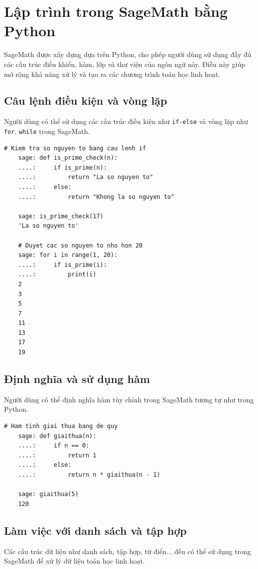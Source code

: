 \section{Lập trình trong SageMath bằng Python}
	
SageMath được xây dựng dựa trên Python, cho phép người dùng sử dụng đầy đủ các cấu trúc điều khiển, hàm, lớp và thư viện của ngôn ngữ này. Điều này giúp mở rộng khả năng xử lý và tạo ra các chương trình toán học linh hoạt.

\subsection{Câu lệnh điều kiện và vòng lặp}
Người dùng có thể sử dụng các cấu trúc điều kiện như \texttt{if-else} và vòng lặp như \texttt{for}, \texttt{while} trong SageMath.

\begin{lstlisting}[basicstyle=\ttfamily\small]
	# Kiem tra so nguyen to bang cau lenh if
	sage: def is_prime_check(n):
	....:     if is_prime(n):
	....:         return "La so nguyen to"
	....:     else:
	....:         return "Khong la so nguyen to"
	
	sage: is_prime_check(17)
	'La so nguyen to'
	
	# Duyet cac so nguyen to nho hon 20
	sage: for i in range(1, 20):
	....:     if is_prime(i):
	....:         print(i)
	2
	3
	5
	7
	11
	13
	17
	19
\end{lstlisting}

\subsection{Định nghĩa và sử dụng hàm}
Người dùng có thể định nghĩa hàm tùy chỉnh trong SageMath tương tự như trong Python.

\begin{lstlisting}[basicstyle=\ttfamily\small]
	# Ham tinh giai thua bang de quy
	sage: def giaithua(n):
	....:     if n == 0:
	....:         return 1
	....:     else:
	....:         return n * giaithua(n - 1)
	
	sage: giaithua(5)
	120
\end{lstlisting}

\subsection{Làm việc với danh sách và tập hợp}
Các cấu trúc dữ liệu như danh sách, tập hợp, từ điển... đều có thể sử dụng trong SageMath để xử lý dữ liệu toán học linh hoạt.

